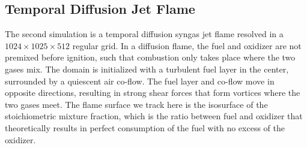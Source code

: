\subsection{Temporal Diffusion Jet Flame} %
\label{sub:temporal_diffusion_jet_flame}
%
The second simulation is a temporal diffusion syngas jet flame resolved in a
$1024 \times 1025 \times 512$ regular grid.
%
In a diffusion flame, the fuel and oxidizer are not premixed before ignition,
such that combustion only takes place where the two gases mix.
%
The domain is initialized with a turbulent fuel layer in the center, surrounded
by a quiescent air co-flow.
%
The fuel layer and co-flow move in opposite directions, resulting in strong
shear forces that form vortices where the two gases meet.
%
The flame surface we track here is the isosurface of the stoichiometric mixture
fraction, which is the ratio between fuel and oxidizer that theoretically
results in perfect consumption of the fuel with no excess of the oxidizer.
%

